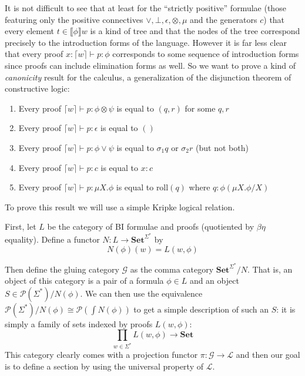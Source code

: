 \documentclass[sigconf,anonymous,review,screen]{acmart}
\newcommand{\Set}{\mathbf{Set}}
\begin{document}
It is not difficult to see that at least for the ``strictly positive''
formulae (those featuring only the positive connectives
$\vee,\bot,\epsilon,\otimes,\mu$ and the generators $c$) that every
element $t \in \llbracket \phi \rrbracket w$ is a kind of tree and
that the nodes of the tree correspond precisely to the introduction
forms of the language. However it is far less clear that every proof
$x:\lceil w \rceil \vdash p : \phi$ corresponds to some sequence of
introduction forms since proofs can include elimination forms as
well. So we want to prove a kind of \emph{canonicity} result for the
calculus, a generalization of the disjunction theorem of constructive
logic:

\begin{enumerate}
\item Every proof $\lceil w \rceil \vdash p : \phi \otimes \psi$ is equal to $(q,r)$ for some $q,r$
\item Every proof $\lceil w \rceil \vdash p : \epsilon$ is equal to $()$
\item Every proof $\lceil w \rceil \vdash p : \phi \vee \psi$ is equal to $\sigma_1q$ or $\sigma_2 r$ (but not both)
\item Every proof $\lceil w \rceil \vdash p : c$ is equal to $x:c$
\item Every proof $\lceil w \rceil \vdash p : \mu X. \phi$ is equal to $\textrm{roll}(q)$ where $q : \phi(\mu X.\phi/X)$
\end{enumerate}

To prove this result we will use a simple Kripke logical relation.

First, let $L$ be the category of BI formulae and proofs (quotiented
by $\beta\eta$ equality). Define a functor $N : L \to \Set^{\Sigma^*}$ by
\[ N(\phi)(w) = L(w,\phi) \]

Then define the gluing category $\mathcal G$ as the comma category
$\Set^{\Sigma^*}/N$. That is, an object of this category is a pair of
a formula $\phi \in L$ and an object $S \in \mathcal
P(\Sigma^*)/N(\phi)$. We can then use the equivalence $\mathcal
P(\Sigma^*)/N(\phi) \cong \mathcal P(\int N(\phi))$ to get a simple
description of such an $S$: it is simply a family of sets indexed by
proofs $L(w,\phi)$:
\[ \prod_{w\in\Sigma^*} L(w,\phi) \to \Set \]
This category clearly comes with a projection functor $\pi : \mathcal
G \to \mathcal L$ and then our goal is to define a section by using
the universal property of $\mathcal L$.
\end{document}
